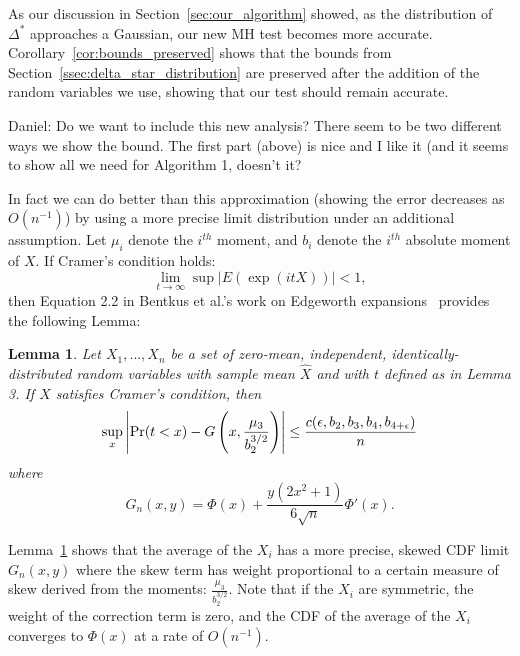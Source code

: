 \documentclass{article}
\newtheorem{lemma}{Lemma}
\begin{document}
As our discussion in Section~\ref{sec:our_algorithm} showed, as the distribution
of $\Delta^*$ approaches a Gaussian, our new MH test becomes more accurate.
Corollary~\ref{cor:bounds_preserved} shows that the bounds from
Section~\ref{ssec:delta_star_distribution} are preserved after the addition of
the random variables we use, showing that our test should remain accurate.

{\color{blue} Daniel: Do we want to include this new analysis? There seem to be
two different ways we show the bound. The first part (above) is nice and I like
it (and it seems to show all we need for Algorithm 1, doesn't it?}

In fact we can do better than this approximation (showing the error decreases as
$O(n^{-1})$) by using a more precise limit distribution under an additional
assumption. Let $\mu_i$ denote the $i^{th}$ moment, and $b_i$ denote the
$i^{th}$ absolute moment of $X$. If Cramer's condition holds:
\begin{equation}\label{eq:cramers_condition}
    \lim_{t \to \infty} \sup |E(\exp(i t X))| < 1,
\end{equation}
then Equation 2.2 in Bentkus et al.'s work on Edgeworth
expansions~\cite{Bentkus97} provides the following Lemma:

\begin{lemma}\label{lem:clt_edgeworth}
Let $X_1,\ldots,X_n$ be a set of zero-mean, independent, identically-distributed
random variables with sample mean $\hat{X}$ and with $t$ defined as in Lemma 3.
If $X$ satisfies Cramer's condition, then
\begin{equation}\label{eq:clt-bounds_edgeworth}
    \sup_x\left|{\rm Pr}(t<x) - G\left(x, \frac{\mu_3}{b_2^{3/2}}\right)\right| \leq \frac{c(\epsilon,b_2,b_3,b_4,b_{4+\epsilon})}{n}
\end{equation}
where
\begin{equation}
    G_n(x,y) = \Phi(x) + \frac{y(2x^2+1)}{6\sqrt{n}}\Phi'(x).
\end{equation}
\end{lemma}

Lemma~\ref{lem:clt_edgeworth} shows that the average of the $X_i$ has a more
precise, skewed CDF limit $G_n(x,y)$ where the skew term has weight proportional
to a certain measure of skew derived from the moments:
$\frac{\mu_3}{b_2^{3/2}}$. Note that if the $X_i$ are symmetric, the weight of
the correction term is zero, and the CDF of the average of the $X_i$ converges
to $\Phi(x)$ at a rate of $O(n^{-1})$.
\end{document}
